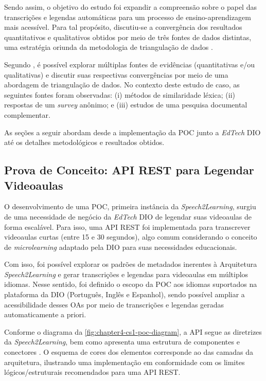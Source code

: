 Sendo assim, o objetivo do estudo foi expandir a compreensão sobre o papel das transcrições e legendas automáticas para um processo de ensino-aprendizagem mais acessível. Para tal propósito, discutiu-se a convergência dos resultados quantitativos e qualitativos obtidos por meio de três fontes de dados distintas, uma estratégia oriunda da metodologia de triangulação de dados \cite{LimaJunior2021}.

Segundo \cite{Farquhar2020}, é possível explorar múltiplas fontes de evidências (quantitativas e/ou qualitativas) e discutir suas respectivas convergências por meio de uma abordagem de triangulação de dados. No contexto deste estudo de caso, as seguintes fontes foram observadas: (i) métodos de similaridade léxica; (ii) respostas de um \textit{survey} anônimo; e (iii) estudos de uma pesquisa documental complementar.

As seções a seguir abordam desde a implementação da POC junto a \textit{EdTech} DIO até os detalhes metodológicos e resultados obtidos.

\subsection{Prova de Conceito: API REST para Legendar Videoaulas}

O desenvolvimento de uma POC, primeira instância da \textit{Speech2Learning}, surgiu de uma necessidade de negócio da \textit{EdTech} DIO de legendar suas videoaulas de forma escalável. Para isso, uma API REST foi implementada para transcrever videoaulas curtas (entre 15 e 30 segundos), algo comum considerando o conceito de \textit{microlearning} adaptado pela DIO para suas necessidades educacionais. 

Com isso, foi possível explorar os padrões de metadados inerentes à Arquitetura \textit{Speech2Learning} e gerar transcrições e legendas para videoaulas em múltiplos idiomas. Nesse sentido, foi definido o escopo da POC aos idiomas suportados na plataforma da DIO (Português, Inglês e Espanhol), sendo possível ampliar a acessibilidade desses OAs por meio de transcrições e legendas geradas automaticamente a priori.

Conforme o diagrama da \autoref{fig:chapter4-cs1-poc-diagram}, a API segue as diretrizes da \textit{Speech2Learning}, bem como apresenta uma estrutura de componentes e conectores \cite{Bass2021}. O esquema de cores dos elementos corresponde ao das camadas da arquitetura, ilustrando uma implementação em conformidade com os limites lógicos/estruturais recomendados para uma API REST.

